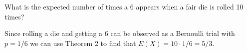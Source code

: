 \documentclass[../main.tex]{subfiles}
\begin{document}
What is the expected number of times a 6 appears when a fair die is rolled 10 times?

\solution

Since rolling a die and getting a $6$ can be observed as a Bernoulli trial with $p = 1/6$ we can use
Theorem 2 to find that $E(X) = 10\cdot 1/6 = 5/3$.
\end{document}
